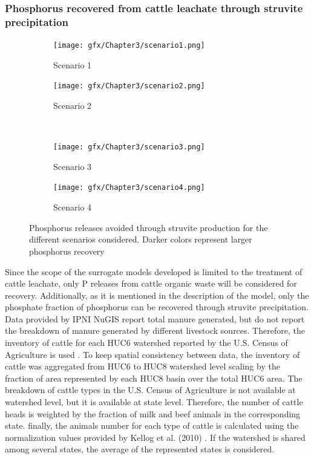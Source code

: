 \begin{refsection}[referencesCh3]
\subsubsection{Phosphorus recovered from cattle leachate through struvite precipitation}
\begin{figure}
	\begin{subfigure}[t]{0.49\textheight}
		\texttt{[image: gfx/Chapter3/scenario1.png]}
		\caption{Scenario 1}
		\label{fig:scenario1}
	\end{subfigure}
	\begin{subfigure}[t]{0.49\textheight}
		\texttt{[image: gfx/Chapter3/scenario2.png]} 
		\caption{Scenario 2}
		\label{fig:scenario2}
	\end{subfigure}
	\\
	\begin{subfigure}[t]{0.49\textheight}
		\texttt{[image: gfx/Chapter3/scenario3.png]}
		\caption{Scenario 3}
		\label{fig:scenario3}
	\end{subfigure}
	\begin{subfigure}[t]{0.49\textheight}
		\texttt{[image: gfx/Chapter3/scenario4.png]}
		\caption{Scenario 4}
		\label{fig:scenario4}
	\end{subfigure}
	
	\caption{Phosphorus releases avoided through struvite production for the different scenarios considered. Darker colors represent larger phosphorus recovery}
	\label{fig:plot_scenarios}
\end{figure}

Since the scope of the surrogate models developed is limited to the treatment of cattle leachate, only P releases from cattle organic waste will be considered for recovery. Additionally, as it is mentioned in the description of the model, only the phosphate fraction of phosphorus can be recovered through struvite precipitation. Data provided by IPNI NuGIS \citep{NuGIS} report total manure generated, but do not report the breakdown of manure generated by different livestock sources. Therefore, the inventory of cattle for each HUC6 watershed reported by the U.S. Census of Agriculture is used \citep{2017CensusofAgriculture}. To keep spatial consistency between data, the inventory of cattle was aggregated from HUC6 to HUC8 watershed level scaling by the fraction of area represented by each HUC8 basin over the total HUC6 area. The breakdown of cattle types in the U.S. Census of Agriculture is not available at watershed level, but it is available at state level. Therefore, the number of cattle heads is weighted by the fraction of milk and beef animals in the corresponding state. finally, the animals number for each type of cattle is calculated using the normalization values provided by Kellog et al. (2010) \citep{Kellog2000}. If the watershed is shared among several states, the average of the represented states is considered.


\end{refsection}
